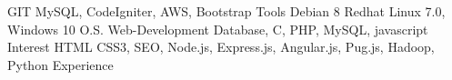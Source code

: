 \begin{cvhonors}
  \cvhonor
    {GIT}
    {MySQL, CodeIgniter, AWS, Bootstrap}
    {}
    {Tools}
  \cvhonor
    {Debian 8}
    {Redhat Linux 7.0, Windows 10}
    {}
    {O.S.}
  \cvhonor
    {Web-Development}
    {Database, C, PHP, MySQL, javascript}
    {}
    {Interest}
  \cvhonor
    {HTML}
    {CSS3, SEO, Node.js, Express.js, Angular.js, Pug.js, Hadoop, Python}
    {}
    {Experience}
\end{cvhonors}
